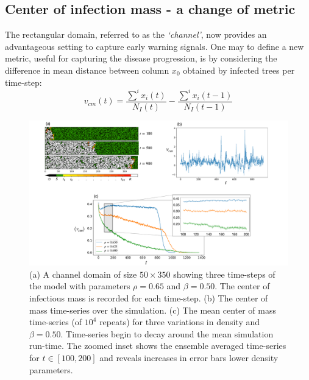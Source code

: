 
\subsection{Center of infection mass - a change of metric}

The rectangular domain, referred to as the \textit{`channel'}, now provides an advantageous setting to capture early warning signals. %
One may to define a new metric, useful for capturing the disease progression, is by considering the difference in mean distance between column $x_0$ obtained by infected trees per time-step:
\begin{equation}
   v_{cm}(t) = \frac{\sum^i x_i(t)}{N_I(t)} - \frac{\sum^i x_i(t-1)}{N_I(t-1)}
   \label{eq:COM}
\end{equation}

\begin{figure}
    \centering
    \includegraphics[scale=0.30]{chapter3/figures/figure10.pdf}
    \caption{(a) A channel domain of size $50\times350$ showing three time-steps of the model with parameters $\rho=0.65$ and $\beta=0.50$. The center of infectious mass is recorded for each time-step. (b) The center of mass time-series over the simulation. (c) The mean center of mass time-series (of $10^4$ repeats) for three variations in density and $\beta=0.50$. Time-series begin to decay around the mean simulation run-time.  The zoomed inset shows the ensemble averaged time-series for $t\in[100, 200]$ and reveals increases in error bars lower density parameters.}
    \label{fig:ews-primer}
\end{figure}


